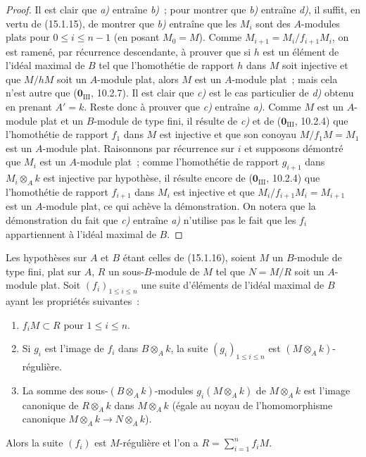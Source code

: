 \begin{proof}
Il est clair que \emph{a)} entraîne \emph{b)}~; pour montrer que \emph{b)} entraîne \emph{d)}, il suffit,
en vertu de (15.1.15), de montrer que \emph{b)} entraîne que les $M_i$ sont des
$A$-modules plats pour $0\leq i\leq n-1$ (en posant $M_0=M$). Comme
$M_{i+1}=M_i/f_{i+1}M_i$, on est ramené, par récurrence descendante, à prouver
que si $h$ est un élément de l'idéal maximal de $B$ tel que l'homothétie de
rapport $h$ dans $M$ soit injective et que $M/hM$ soit un $A$-module plat,
alors $M$ est un $A$-module plat~; mais cela n'est autre que
($\mathbf{0}_{\mathrm{III}}$, 10.2.7). Il est clair que \emph{c)} est le cas particulier de
\emph{d)} obtenu en prenant $A'=k$. Reste donc à prouver que \emph{c)} entraîne \emph{a)}. Comme
$M$ est un $A$-module plat et un $B$-module de type fini, il résulte de \emph{c)} et
de ($\mathbf{0}_{\mathrm{III}}$, 10.2.4) que l'homothétie de rapport $f_1$ dans $M$
est injective et que son conoyau $M/f_1M=M_1$ est un $A$-module plat.
Raisonnons par récurrence sur $i$ et supposons démontré que $M_i$ est un
$A$-module plat~; comme l'homothétie de rapport $g_{i+1}$ dans
$M_i\otimes_A k$ est injective par hypothèse, il résulte encore de
($\mathbf{0}_{\mathrm{III}}$, 10.2.4) que l'homothétie de rapport $f_{i+1}$ dans
$M_i$ est injective et que $M_i/f_{i+1}M_i=M_{i+1}$ est un $A$-module plat,
ce qui achève la démonstration. On notera que la démonstration du fait que \emph{c)}
entraîne \emph{a)} n'utilise pas le fait que les $f_i$ appartiennent à l'idéal
maximal de $B$.
\end{proof}

\begin{corollary}[15.1.17]
\label{0.15.1.17-fr}
Les hypothèses sur $A$ et $B$ étant celles de \textup{(15.1.16)}, soient $M$ un
$B$-module de type fini, plat sur $A$, $R$ un sous-$B$-module de $M$ tel que
$N=M/R$ soit un $A$-module plat. Soit $(f_i)_{1\leq i\leq n}$ une suite
d'éléments de l'idéal maximal de $B$ ayant les propriétés suivantes~:
\begin{enumerate}
  \item[\textup{(i)}] $f_iM\subset R$ pour $1\leq i\leq n$.
  \item[\textup{(ii)}] Si $g_i$ est l'image de $f_i$ dans $B\otimes_A k$, la suite
  $(g_i)_{1\leq i\leq n}$ est $(M\otimes_A k)$-régulière.
  \item[\textup{(iii)}] La somme des sous-$(B\otimes_A k)$-modules
  $g_i(M\otimes_A k)$ de $M\otimes_A k$ est l'image canonique de
  $R\otimes_A k$ dans $M\otimes_A k$ (égale au noyau de l'homomorphisme
  canonique $M\otimes_A k\to N\otimes_A k$).
\end{enumerate}

Alors la suite $(f_i)$ est $M$-régulière et l'on a
$R=\sum_{i=1}^n f_iM$.
\end{corollary}

